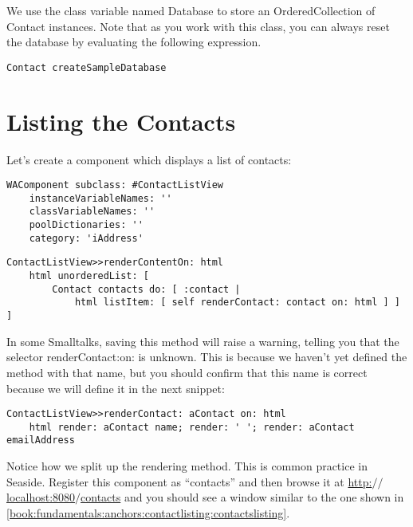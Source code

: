 \documentclass[a4paper,10pt,twoside]{book}
\newcommand{\ct}[1]{{\small\ttfamily\textup{#1}}}
\begin{document}
We use the class variable named \ct{Database} to store an \ct{OrderedCollection} of \ct{Contact} instances. Note that as you work with this class, you can always reset the database by evaluating the following expression.

\begin{lstlisting}
Contact createSampleDatabase
\end{lstlisting}

\section{Listing the Contacts}
\label{book:fundamentals:anchors:contactlisting}

Let's create a component which displays a list of contacts:

\begin{lstlisting}
WAComponent subclass: #ContactListView
    instanceVariableNames: ''
    classVariableNames: ''
    poolDictionaries: ''
    category: 'iAddress'
\end{lstlisting}

\begin{lstlisting}
ContactListView>>renderContentOn: html
    html unorderedList: [
        Contact contacts do: [ :contact |
            html listItem: [ self renderContact: contact on: html ] ] ]
\end{lstlisting}

In some Smalltalks, saving this method will raise a warning, telling you that the selector \ct{renderContact:on:} is unknown. This is because we haven't yet defined the method with that name, but you should confirm that this name is correct because we will define it in the next snippet: 

\begin{lstlisting}
ContactListView>>renderContact: aContact on: html
    html render: aContact name; render: ' '; render: aContact emailAddress
\end{lstlisting}

Notice how we split up the rendering method. This is common practice in Seaside. Register this component as ``contacts'' and then browse it at \href{http://localhost:8080/contacts}{http:$/$$/$localhost:8080$/$contacts} and you should see a window similar to the one shown in \autoref{book:fundamentals:anchors:contactlisting:contactslisting}.
\end{document}
